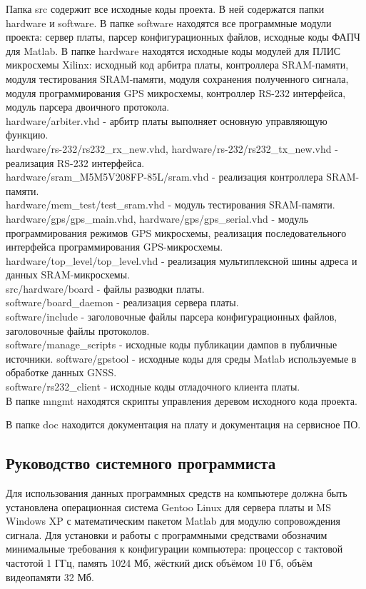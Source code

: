 Папка src содержит все исходные коды проекта. В ней содержатся папки hardware и software. В папке software находятся все программные модули проекта:
сервер платы, парсер конфигурационных файлов, исходные коды ФАПЧ для Matlab. В папке hardware находятся исходные коды модулей для ПЛИС микросхемы Xilinx:
исходный код арбитра платы, контроллера SRAM-памяти, модуля тестирования SRAM-памяти, модуля сохранения полученного сигнала, модуля программирования GPS
микросхемы, контроллер RS-232 интерфейса, модуль парсера двоичного протокола. \\
hardware/arbiter.vhd - арбитр платы выполняет основную управляющую функцию. \\
hardware/rs-232/rs232\_rx\_new.vhd, hardware/rs-232/rs232\_tx\_new.vhd - реализация RS-232 интерфейса. \\
hardware/sram\_M5M5V208FP-85L/sram.vhd - реализация контроллера SRAM-памяти. \\
hardware/mem\_test/test\_sram.vhd - модуль тестирования SRAM-памяти. \\
hardware/gps/gps\_main.vhd, hardware/gps/gps\_serial.vhd - модуль программирования режимов GPS микросхемы, реализация последовательного 
	интерфейса программирования GPS-микросхемы. \\
hardware/top\_level/top\_level.vhd - реализация мультиплексной шины адреса и данных SRAM-микросхемы. \\
src/hardware/board - файлы разводки платы. \\
software/board\_daemon - реализация сервера платы. \\
software/include - заголовочные файлы парсера конфигурационных файлов, заголовочные файлы протоколов. \\
software/manage\_scripts - исходные коды публикации дампов в публичные источники.
software/gpstool - исходные коды для среды Matlab используемые в обработке данных GNSS. \\
software/rs232\_client - исходные коды отладочного клиента платы. \\


В папке mngmt находятся скрипты управления деревом исходного кода проекта.

В папке doc находится документация на плату и документация на сервисное ПО.


\subsection{Руководство системного программиста}
Для использования данных программных средств на компьютере должна быть установлена операционная система Gentoo Linux для сервера платы и MS Windows XP с 
математическим пакетом Matlab для модулю сопровождения сигнала. 
Для установки и работы с программными средствами обозначим минимальные требования к конфигурации компьютера: процессор с тактовой частотой 1 ГГц, память 1024 Мб,
жёсткий диск объёмом 10 Гб, объём видеопамяти 32 Мб. 

